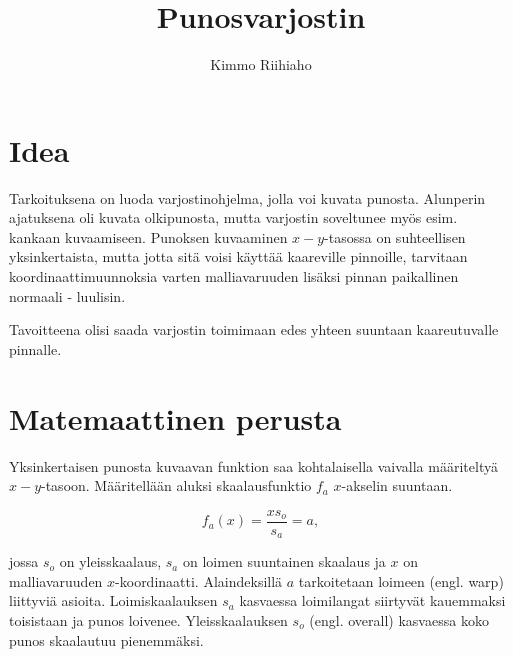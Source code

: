 \documentclass[utf8,bachelor]{gradu3}
\begin{document}
\title{Punosvarjostin}



\author{Kimmo Riihiaho}
\type{} %

\maketitle

\mainmatter

\chapter{Idea}

Tarkoituksena on luoda varjostinohjelma, jolla voi kuvata punosta. Alunperin ajatuksena oli kuvata olkipunosta, mutta varjostin soveltunee myös esim. kankaan kuvaamiseen. Punoksen kuvaaminen $x-y$-tasossa on suhteellisen yksinkertaista, mutta jotta sitä voisi käyttää kaareville pinnoille, tarvitaan koordinaattimuunnoksia varten malliavaruuden lisäksi pinnan paikallinen normaali - luulisin.

Tavoitteena olisi saada varjostin toimimaan edes yhteen suuntaan kaareutuvalle pinnalle.  


\chapter{Matemaattinen perusta}

Yksinkertaisen punosta kuvaavan funktion saa kohtalaisella vaivalla määriteltyä $x-y$-tasoon. Määritellään aluksi skaalausfunktio $f_a$ $x$-akselin suuntaan.

\begin{equation}
\label{eq:warp}
f_a(x) = \frac{xs_o}{s_a} = a,
\end{equation}

jossa $s_o$ on yleisskaalaus, $s_a$ on loimen suuntainen skaalaus ja $x$ on malliavaruuden $x$-koordinaatti. Alaindeksillä $a$ tarkoitetaan loimeen (engl. warp) liittyviä asioita. Loimiskaalauksen $s_a$ kasvaessa loimilangat siirtyvät kauemmaksi toisistaan ja punos loivenee. Yleisskaalauksen $s_o$ (engl. overall) kasvaessa koko punos skaalautuu pienemmäksi.
\end{document}

